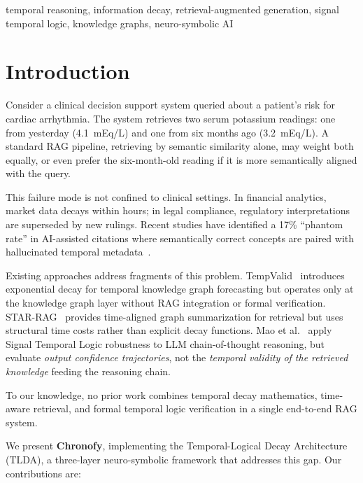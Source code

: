 \documentclass[conference]{IEEEtran}
\begin{document}
\begin{IEEEkeywords}
temporal reasoning, information decay, retrieval-augmented generation, signal temporal logic, knowledge graphs, neuro-symbolic AI
\end{IEEEkeywords}

\section{Introduction}

Consider a clinical decision support system queried about a patient's risk for cardiac arrhythmia. The system retrieves two serum potassium readings: one from yesterday (4.1~mEq/L) and one from six months ago (3.2~mEq/L). A standard RAG pipeline, retrieving by semantic similarity alone, may weight both equally, or even prefer the six-month-old reading if it is more semantically aligned with the query.

This failure mode is not confined to clinical settings. In financial analytics, market data decays within hours; in legal compliance, regulatory interpretations are superseded by new rulings. Recent studies have identified a 17\% ``phantom rate'' in AI-assisted citations where semantically correct concepts are paired with hallucinated temporal metadata~\cite{ilter2026gap}.

Existing approaches address fragments of this problem. TempValid~\cite{huang2024tempvalid} introduces exponential decay for temporal knowledge graph forecasting but operates only at the knowledge graph layer without RAG integration or formal verification. STAR-RAG~\cite{zhu2025starrag} provides time-aligned graph summarization for retrieval but uses structural time costs rather than explicit decay functions. Mao et al.~\cite{mao2025stl} apply Signal Temporal Logic robustness to LLM chain-of-thought reasoning, but evaluate \emph{output confidence trajectories}, not the \emph{temporal validity of the retrieved knowledge} feeding the reasoning chain.

To our knowledge, no prior work combines temporal decay mathematics, time-aware retrieval, and formal temporal logic verification in a single end-to-end RAG system.

We present \textbf{Chronofy}, implementing the Temporal-Logical Decay Architecture (TLDA), a three-layer neuro-symbolic framework that addresses this gap. Our contributions are:
\end{document}
